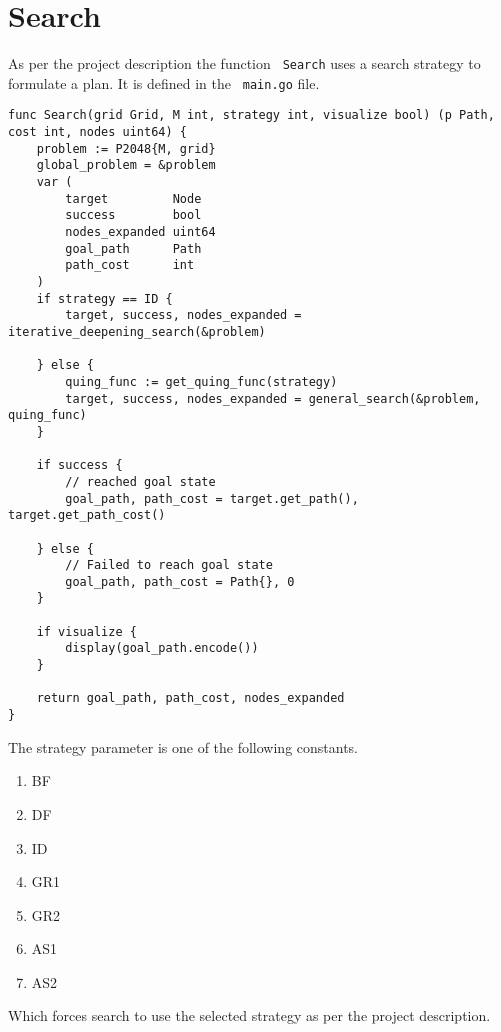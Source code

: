 \documentclass[14pt,a4paper]{report}
\begin{document}
\section{Search}
As per the project description the function \verb+ Search+ uses a search strategy to 
formulate a plan. It is defined in the \verb+ main.go+ file.
\begin{lstlisting}
func Search(grid Grid, M int, strategy int, visualize bool) (p Path, cost int, nodes uint64) {
    problem := P2048{M, grid}
    global_problem = &problem
    var (
        target         Node
        success        bool
        nodes_expanded uint64
        goal_path      Path
        path_cost      int
    )
    if strategy == ID {
        target, success, nodes_expanded = iterative_deepening_search(&problem)

    } else {
        quing_func := get_quing_func(strategy)
        target, success, nodes_expanded = general_search(&problem, quing_func)
    }

    if success {
        // reached goal state
        goal_path, path_cost = target.get_path(), target.get_path_cost()

    } else {
        // Failed to reach goal state
        goal_path, path_cost = Path{}, 0
    }

    if visualize {
        display(goal_path.encode())
    }

    return goal_path, path_cost, nodes_expanded
}
\end{lstlisting}

The strategy parameter is one of the following constants.
\begin{enumerate}
\item BF
\item DF
\item ID
\item GR1
\item GR2
\item AS1
\item AS2
\end{enumerate}
Which forces search to use the selected strategy as per the project description.
\end{document}
